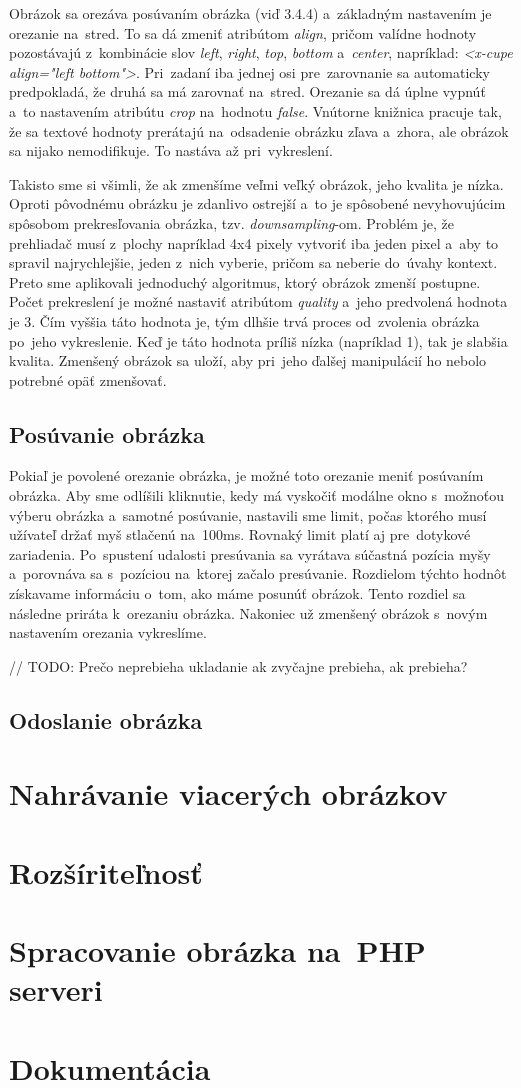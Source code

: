 Obrázok sa orezáva posúvaním obrázka (viď 3.4.4) a~základným nastavením je orezanie na~stred. To sa dá zmeniť atribútom \emph{align}, pričom valídne hodnoty pozostávajú z~kombinácie slov \emph{left}, \emph{right}, \emph{top}, \emph{bottom} a~\emph{center}, napríklad: \emph{<x-cupe align="left bottom"\textgreater}. Pri~zadaní iba jednej osi pre~zarovnanie sa automaticky predpokladá, že druhá sa má zarovnať na~stred. Orezanie sa dá úplne vypnúť a~to nastavením atribútu \emph{crop} na~hodnotu \emph{false}. Vnútorne knižnica pracuje tak, že sa textové hodnoty prerátajú na~odsadenie obrázku zľava a~zhora, ale obrázok sa nijako nemodifikuje. To nastáva až pri~vykreslení.

Takisto sme si všimli, že ak zmenšíme veľmi veľký obrázok, jeho kvalita je nízka. Oproti pôvodnému obrázku je zdanlivo ostrejší a~to je spôsobené nevyhovujúcim spôsobom prekresľovania obrázka, tzv. \emph{downsampling}-om. Problém je, že prehliadač musí z~plochy napríklad 4x4 pixely vytvoriť iba jeden pixel a~aby to spravil najrychlejšie, jeden z~nich vyberie, pričom sa neberie do~úvahy kontext. Preto sme aplikovali jednoduchý algoritmus, ktorý obrázok zmenší postupne. Počet prekreslení je možné nastaviť atribútom \emph{quality} a~jeho predvolená hodnota je 3. Čím vyššia táto hodnota je, tým dlhšie trvá proces od~zvolenia obrázka po~jeho vykreslenie. Keď je táto hodnota príliš nízka (napríklad 1), tak je slabšia kvalita. Zmenšený obrázok sa uloží, aby pri~jeho ďalšej manipulácií ho nebolo potrebné opäť zmenšovať.

\subsection{Posúvanie obrázka}

Pokiaľ je povolené orezanie obrázka, je možné toto orezanie meniť posúvaním obrázka. Aby sme odlíšili kliknutie, kedy má vyskočiť modálne okno s~možnoťou výberu obrázka a~samotné posúvanie, nastavili sme limit, počas ktorého musí užívateľ držať myš stlačenú na~100ms. Rovnaký limit platí aj pre~dotykové zariadenia. Po~spustení udalosti presúvania sa vyrátava súčastná pozícia myšy a~porovnáva sa s~pozíciou na~ktorej začalo presúvanie. Rozdielom týchto hodnôt získavame informáciu o~tom, ako máme posunúť obrázok. Tento rozdiel sa následne priráta k~orezaniu obrázka. Nakoniec už zmenšený obrázok s~novým nastavením orezania vykreslíme.

// TODO: Prečo neprebieha ukladanie ak zvyčajne prebieha, ak prebieha? 

\subsection{Odoslanie obrázka}

\section{Nahrávanie viacerých obrázkov}
\section{Rozšíriteľnosť}
\section{Spracovanie obrázka na~PHP serveri}
\section{Dokumentácia}